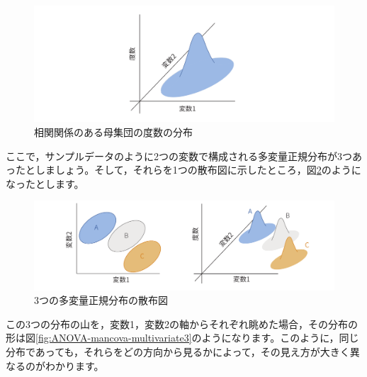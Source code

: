 \documentclass[
  12pt,
  a5jpaper,
  lualatex, ja=standard]{bxjsbook}
\begin{document}
\begin{figure}[!ht]

{\centering \includegraphics[width=1\linewidth]{images/ANOVA/mancova-multivariate} 

}

\caption{相関関係のある母集団の度数の分布}\label{fig:ANOVA-mancova-multivariate}
\end{figure}

ここで，サンプルデータのように2つの変数で構成される多変量正規分布が3つあったとしましょう。そして，それらを1つの散布図に示したところ，図\ref{fig:ANOVA-mancova-multivariate2}のようになったとします。

\begin{figure}[!ht]

{\centering \includegraphics[width=1\linewidth]{images/ANOVA/mancova-multivariate2} 

}

\caption{3つの多変量正規分布の散布図}\label{fig:ANOVA-mancova-multivariate2}
\end{figure}

この3つの分布の山を，変数1，変数2の軸からそれぞれ眺めた場合，その分布の形は図\ref{fig:ANOVA-mancova-multivariate3}のようになります。このように，同じ分布であっても，それらをどの方向から見るかによって，その見え方が大きく異なるのがわかります。
\end{document}

